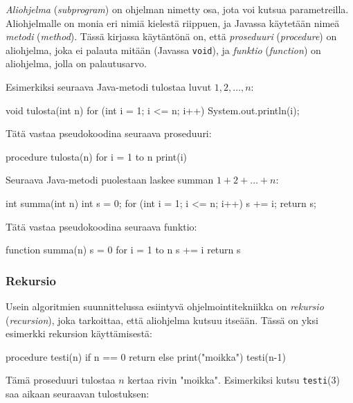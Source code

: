 \emph{Aliohjelma} (\emph{subprogram}) on ohjelman nimetty osa,
jota voi kutsua parametreilla.
Aliohjelmalle on monia eri nimiä kielestä riippuen,
ja Javassa käytetään nimeä \emph{metodi} (\emph{method}).
Tässä kirjassa käytäntönä on,
että \emph{proseduuri} (\emph{procedure}) on aliohjelma,
joka ei palauta mitään (Javassa \texttt{void}),
ja \emph{funktio} (\emph{function}) on aliohjelma,
jolla on palautusarvo.

Esimerkiksi seuraava Java-metodi tulostaa luvut $1,2,\dots,n$:

\begin{code}
void tulosta(int n) {
    for (int i = 1; i <= n; i++) {
        System.out.println(i);
    }
}
\end{code}

Tätä vastaa pseudokoodina seuraava proseduuri:

\begin{code}
procedure tulosta(n)
    for i = 1 to n
        print(i)
\end{code}

Seuraava Java-metodi puolestaan laskee summan $1+2+\dots+n$:

\begin{code}
int summa(int n) {
    int s = 0;
    for (int i = 1; i <= n; i++) {
        s += i;
    }
    return s;
}
\end{code}

Tätä vastaa pseudokoodina seuraava funktio:

\begin{code}
function summa(n)
    s = 0
    for i = 1 to n
        s += i
    return s
\end{code}

\subsubsection{Rekursio}


Usein algoritmien suunnittelussa esiintyvä ohjelmointitekniikka on
\emph{rekursio} (\emph{recursion}),
joka tarkoittaa, että aliohjelma kutsuu itseään.
Tässä on yksi esimerkki rekursion käyttämisestä:

\begin{code}
procedure testi(n)
    if n == 0
        return
    else
        print("moikka")
        testi(n-1)
\end{code}

Tämä proseduuri tulostaa $n$ kertaa rivin "moikka".
Esimerkiksi kutsu \texttt{testi}(3) saa aikaan seuraavan tulostuksen:

